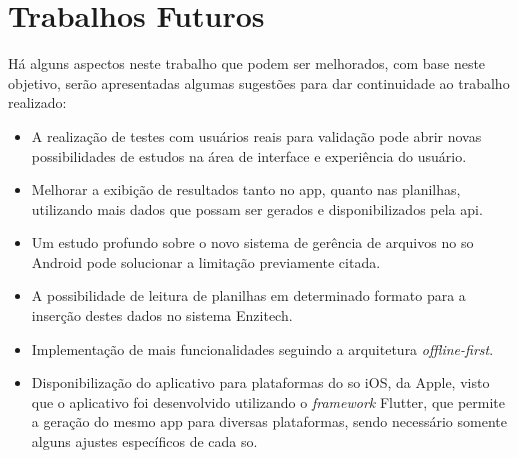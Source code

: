 \section{Trabalhos Futuros}\label{sec:futuro}
Há alguns aspectos neste trabalho que podem ser melhorados, com base neste objetivo, serão apresentadas algumas sugestões para dar continuidade ao trabalho realizado:
\begin{itemize}
    \item A realização de testes com usuários reais para validação pode abrir novas possibilidades de estudos na área de interface e experiência do usuário.
    \item Melhorar a exibição de resultados tanto no \ac{app}, quanto nas planilhas, utilizando mais dados que possam ser gerados e disponibilizados pela \ac{api}.
    \item Um estudo profundo sobre o novo sistema de gerência de arquivos no \ac{so} Android pode solucionar a limitação previamente citada.
    \item A possibilidade de leitura de planilhas em determinado formato para a inserção destes dados no sistema Enzitech.
    \item Implementação de mais funcionalidades seguindo a arquitetura \textit{offline-first}.
    \item Disponibilização do aplicativo para plataformas do \ac{so} iOS, da Apple, visto que o aplicativo foi desenvolvido utilizando o \textit{framework} Flutter, que permite a geração do mesmo app para diversas plataformas, sendo necessário somente alguns ajustes específicos de cada \ac{so}.
\end{itemize}